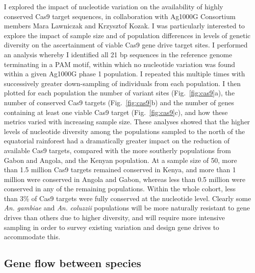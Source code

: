 \begin{refsection}
I explored the impact of nucleotide variation on the availability of highly conserved Cas9 target sequences, in collaboration with Ag1000G Consortium members Mara Lawniczak and Krzysztof Kozak.
%
I was particularly interested to explore the impact of sample size and of population differences in levels of genetic diversity on the ascertainment of viable Cas9 gene drive target sites.
%
I performed an analysis whereby I identified all 21 bp sequences in the reference genome terminating in a PAM motif, within which no nucleotide variation was found within a given Ag1000G phase 1 population.
%
I repeated this multiple times with successively greater down-sampling of individuals from each population.
%
I then plotted for each population the number of variant sites (Fig.~\ref{fig:cas9}a), the number of conserved Cas9 targets (Fig.~\ref{fig:cas9}b) and the number of genes containing at least one viable Cas9 target (Fig.~\ref{fig:cas9}c), and how these metrics varied with increasing sample size.
%
These analyses showed that the higher levels of nucleotide diversity among the populations sampled to the north of the equatorial rainforest had a dramatically greater impact on the reduction of available Cas9 targets, compared with the more southerly populations from Gabon and Angola, and the Kenyan population.
%
At a sample size of 50, more than 1.5 million Cas9 targets remained conserved in Kenya, and more than 1 million were conserved in Angola and Gabon, whereas less than 0.5 million were conserved in any of the remaining populations.
%
Within the whole cohort, less than 3\% of Cas9 targets were fully conserved at the nucleotide level.
%
Clearly some \textit{An. gambiae} and \textit{An. coluzzii} populations will be more naturally resistant to gene drives than others due to higher diversity, and will require more intensive sampling in order to survey existing variation and design gene drives to accommodate this.


\subsection{Gene flow between species}\label{subsec:species}





\end{refsection}
